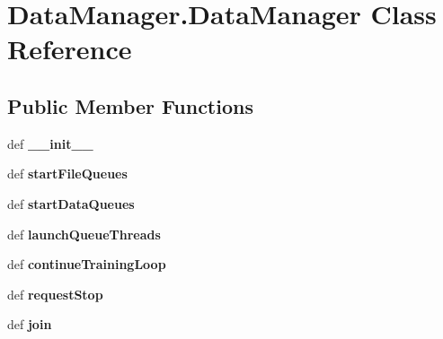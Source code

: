 \hypertarget{classDataManager_1_1DataManager}{\section{Data\-Manager.\-Data\-Manager Class Reference}
\label{classDataManager_1_1DataManager}
}
\subsection*{Public Member Functions}
\begin{DoxyCompactItemize}
\item 
\hypertarget{classDataManager_1_1DataManager_a6720284570316a8b502e468074e22d28}{def {\bfseries \-\_\-\-\_\-init\-\_\-\-\_\-}}\label{classDataManager_1_1DataManager_a6720284570316a8b502e468074e22d28}

\item 
\hypertarget{classDataManager_1_1DataManager_adfc56295e24739346eb4673877ae0277}{def {\bfseries start\-File\-Queues}}\label{classDataManager_1_1DataManager_adfc56295e24739346eb4673877ae0277}

\item 
\hypertarget{classDataManager_1_1DataManager_a8dc65af6fee5bd5bb20f0191848fa2fb}{def {\bfseries start\-Data\-Queues}}\label{classDataManager_1_1DataManager_a8dc65af6fee5bd5bb20f0191848fa2fb}

\item 
\hypertarget{classDataManager_1_1DataManager_adc8376ebbcc8fd94f8e7cc2b5ab2e16d}{def {\bfseries launch\-Queue\-Threads}}\label{classDataManager_1_1DataManager_adc8376ebbcc8fd94f8e7cc2b5ab2e16d}

\item 
\hypertarget{classDataManager_1_1DataManager_a7c93e51eb6673ea46f7fb694b65136c3}{def {\bfseries continue\-Training\-Loop}}\label{classDataManager_1_1DataManager_a7c93e51eb6673ea46f7fb694b65136c3}

\item 
\hypertarget{classDataManager_1_1DataManager_a2b48ff573d4ebab478b2e27190a5d069}{def {\bfseries request\-Stop}}\label{classDataManager_1_1DataManager_a2b48ff573d4ebab478b2e27190a5d069}

\item 
\hypertarget{classDataManager_1_1DataManager_a43c7d931d591e95fd4d8572d008dd5e6}{def {\bfseries join}}\label{classDataManager_1_1DataManager_a43c7d931d591e95fd4d8572d008dd5e6}

\end{DoxyCompactItemize}
